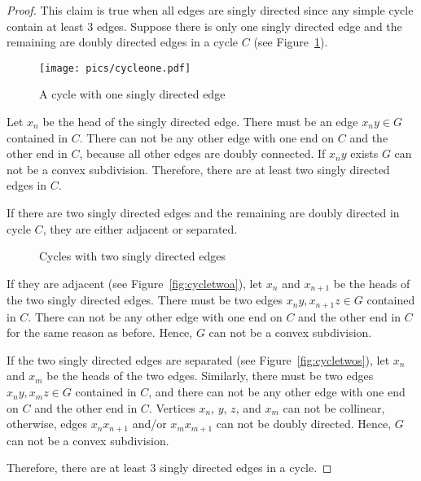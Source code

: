 \documentclass [letterpaper] {article}
\begin{document}
\begin{proof}
  This claim is true when all edges are singly directed since any simple cycle contain at least $3$ edges. Suppose there is only one singly directed edge and the remaining are doubly directed edges in a cycle $C$ (see Figure~\ref{fig:cycleone}).
\begin{figure}[ht]
  \centering
  \texttt{[image: pics/cycleone.pdf]}
  \caption{A cycle with one singly directed edge}
  \label{fig:cycleone}
\end{figure}
Let $x_{n}$ be the head of the singly directed edge. There must be an edge $x_{n}y \in G$ contained in $C$. There can not be any other edge with one end on $C$ and the other end in $C$, because all other edges are doubly connected. If $x_{n}y$ exists $G$ can not be a convex subdivision. Therefore, there are at least two singly directed edges in $C$.

If there are two singly directed edges and the remaining are doubly directed in cycle $C$, they are either adjacent or separated. 
\begin{figure}[ht]
  \centering
  \hspace{10mm}
  \caption{Cycles with two singly directed edges}
  \label{fig:cycletwo}
\end{figure}
If they are adjacent (see Figure~\ref{fig:cycletwoa}), let $x_{n}$ and $x_{n+1}$ be the heads of the two singly directed edges. There must be two edges $x_{n}y, x_{n+1}z \in G$ contained in $C$. There can not be any other edge with one end on $C$ and the other end in $C$ for the same reason as before. Hence, $G$ can not be a convex subdivision.

If the two singly directed edges are separated (see Figure~\ref{fig:cycletwos}), let $x_{n}$ and $x_{m}$ be the heads of the two edges. Similarly, there must be two edges $x_{n}y, x_{m}z \in G$ contained in $C$, and there can not be any other edge with one end on $C$ and the other end in $C$. Vertices $x_{n}$, $y$, $z$, and $x_{m}$ can not be collinear, otherwise, edges $x_{n}x_{n+1}$ and/or $x_{m}x_{m+1}$ can not be doubly directed. Hence, $G$ can not be a convex subdivision.

Therefore, there are at least $3$ singly directed edges in a cycle. 
\end{proof}
\end{document}
